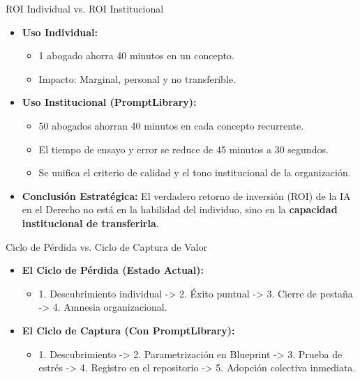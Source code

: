 \documentclass[aspectratio=169]{beamer}
\begin{document}
\begin{frame}{ROI Individual vs. ROI Institucional}

\begin{itemize}
  \item \textbf{Uso Individual:}
  \begin{itemize}
    \item 1 abogado ahorra 40 minutos en un concepto.
    \item Impacto: Marginal, personal y no transferible.
  \end{itemize}
  \item \textbf{Uso Institucional (PromptLibrary):}
  \begin{itemize}
    \item 50 abogados ahorran 40 minutos en cada concepto recurrente.
    \item El tiempo de ensayo y error se reduce de 45 minutos a 30 segundos.
    \item Se unifica el criterio de calidad y el tono institucional de la organización.
  \end{itemize}
  \item \textbf{Conclusión Estratégica:} El verdadero retorno de inversión (ROI) de la IA en el Derecho no está en la habilidad del individuo, sino en la \textbf{capacidad institucional de transferirla}.
\end{itemize}
\end{frame}

\begin{frame}{Ciclo de Pérdida vs. Ciclo de Captura de Valor}

\begin{itemize}
  \item \textbf{El Ciclo de Pérdida (Estado Actual):}
  \begin{itemize}
    \item 1. Descubrimiento individual -> 2. Éxito puntual -> 3. Cierre de pestaña -> 4. Amnesia organizacional.
  \end{itemize}
  \item \textbf{El Ciclo de Captura (Con PromptLibrary):}
  \begin{itemize}
    \item 1. Descubrimiento -> 2. Parametrización en Blueprint -> 3. Prueba de estrés -> 4. Registro en el repositorio -> 5. Adopción colectiva inmediata.
  \end{itemize}
\end{itemize}
\end{frame}
\end{document}
